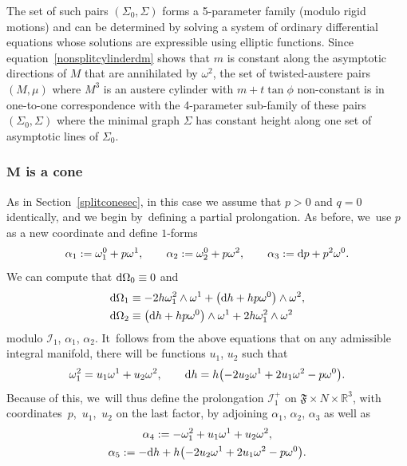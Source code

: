 \documentclass[10pt,a4paper]{amsart}
\def\R{\mathbb{R}}
\def\F{\mathfrak{F}}
\def\calI{\mathcal{I}}
\def\w{\omega}
\numberwithin{equation}{section}
\begin{document}
The set of such pairs $(\Sigma_0,\Sigma)$ forms a 5-parameter family (modulo rigid motions) and can be determined by solving a system of ordinary differential equations whose solutions are expressible using elliptic functions. Since equation~\eqref{nonsplitcylinderdm} shows that $m$ is constant along the asymptotic directions of $M$ that are annihilated by $\w^2$, the set of twisted-austere pairs $(M,\mu)$ where $M^3$ is an austere cylinder with $m+t\tan \phi$ non-constant is in one-to-one correspondence with the 4-parameter sub-family of these pairs $(\Sigma_0,\Sigma)$ where the minimal graph $\Sigma$ has constant height along one set of asymptotic lines of $\Sigma_0$.

\subsubsection[M is a cone]{$\boldsymbol M$ is a cone}

As in Section~\ref{splitconesec}, in this case we assume that $p > 0$ and $q=0$ identically, and we begin by~defining a partial prolongation. As before, we~use $p$ as a new coordinate and define $1$-forms
\begin{gather*} %
\alpha_1 := \w^0_1 + p \w^1, \qquad
\alpha_2 := \w^0_2 + p\w^2, \qquad
\alpha_3:={\rm d}p + p^2 \w^0.
\end{gather*}
We can compute that ${\rm d} \Omega_0\equiv 0$ and
\begin{align*}
{\rm d} \Omega_1 &\equiv -2h \w^2_1 \wedge \w^1 + \big({\rm d}h +hp \w^0\big) \wedge \w^2,\\
{\rm d} \Omega_2 &\equiv \big({\rm d}h+hp \w^0\big) \wedge \w^1 + 2h\w^2_1 \wedge \w^2
\end{align*}
modulo $\calI_1$, $\alpha_1$, $\alpha_2$. It~follows from the above equations that on any admissible integral manifold, there will be functions $u_1$, $u_2$ such that
\begin{gather*}
\w^2_1 = u_1 \w^1 + u_2 \w^2, \qquad
{\rm d}h = h\big({-}2u_2 \w^1 + 2u_1 \w^2 -p\w^0\big).
\end{gather*}
Because of this, we~will thus define the prolongation $\calI^+_1$ on $\F \times N \times \R^3$, with coordinates~$p$,~$u_1$,~$u_2$ on the last factor, by adjoining $\alpha_1$, $\alpha_2$, $\alpha_3$ as well as
\begin{gather*}
\alpha_4 := -\w^2_1 + u_1\w^1 + u_2 \w^2,
\\
\alpha_5 := -{\rm d}h + h\big({-} 2u_2 \w^1+2u_1 \w^2 -p\w^0\big).
\end{gather*}
\end{document}
